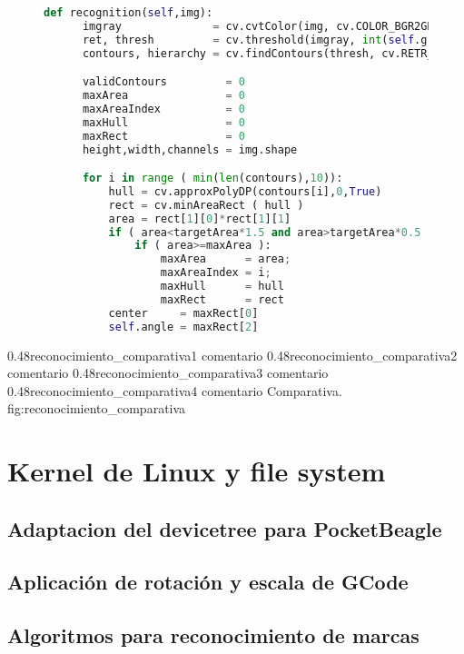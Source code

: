 \begin{figure}[h]
   \begin{lstlisting}[language=python,caption={Algoritmo principal de reconocimiento de marcas en un fotograma},label={cod:reconocimiento2}]
def recognition(self,img):
      imgray              = cv.cvtColor(img, cv.COLOR_BGR2GRAY)
      ret, thresh         = cv.threshold(imgray, int(self.grayThresh), 0xff, cv.THRESH_BINARY_INV)
      contours, hierarchy = cv.findContours(thresh, cv.RETR_EXTERNAL, cv.CHAIN_APPROX_SIMPLE)

      validContours         = 0
      maxArea               = 0
      maxAreaIndex          = 0
      maxHull               = 0
      maxRect               = 0
      height,width,channels = img.shape

      for i in range ( min(len(contours),10)):
          hull = cv.approxPolyDP(contours[i],0,True) 
          rect = cv.minAreaRect ( hull )
          area = rect[1][0]*rect[1][1]
          if ( area<targetArea*1.5 and area>targetArea*0.5 ):
              if ( area>=maxArea ):
                  maxArea      = area;
                  maxAreaIndex = i;
                  maxHull      = hull
                  maxRect      = rect
          center     = maxRect[0]
          self.angle = maxRect[2]
   \end{lstlisting}
\end{figure}


\subfigtwotwo
         {0.48}{reconocimiento_comparativa1} {comentario}
         {0.48}{reconocimiento_comparativa2} {comentario}
         {0.48}{reconocimiento_comparativa3} {comentario}
         {0.48}{reconocimiento_comparativa4} {comentario}
         {Comparativa.}
         {fig:reconocimiento_comparativa}

\section{Kernel de Linux y file system}
   \subsection{Adaptacion del devicetree para PocketBeagle}
\subsection{Aplicación de rotación y escala de GCode}
\subsection{Algoritmos para reconocimiento de marcas}

